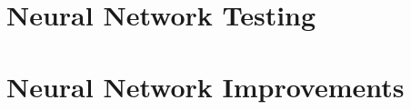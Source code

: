 \section{Neural Network Testing}
\lipsum[11-15]
\section{Neural Network Improvements}
\lipsum[16-20]
